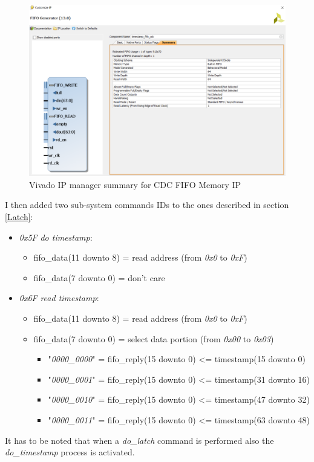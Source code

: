 \begin{figure}[H]
	\centering
	\includegraphics[width=0.6\linewidth]{IMG/ch4/FIFO_IP}
	\caption{Vivado IP manager summary for CDC FIFO Memory IP}
	\label{fig:fifo_ip}
\end{figure}
\noindent I then added two sub-system commands IDs to the ones described in section \ref{Latch}:
\begin{itemize}
	\item \textit{0x5F} \textit{do timestamp}:
	\begin{itemize}
		\item fifo\_data(11 downto 8) = read address (from \textit{0x0} to \textit{0xF})
		\item fifo\_data(7 downto 0) = don't care
	\end{itemize}
	\item \textit{0x6F} \textit{read timestamp}:
	\begin{itemize}
		\item fifo\_data(11 downto 8) = read address (from \textit{0x0} to \textit{0xF})
		\item fifo\_data(7 downto 0) = select data portion (from \textit{0x00} to \textit{0x03})
		\begin{itemize}
			\item "\textit{0000\_0000}" = fifo\_reply(15 downto 0) <= timestamp(15 downto 0)
			\item "\textit{0000\_0001}" = fifo\_reply(15 downto 0) <= timestamp(31 downto 16)
			\item "\textit{0000\_0010}" = fifo\_reply(15 downto 0) <= timestamp(47 downto 32)
			\item "\textit{0000\_0011}" = fifo\_reply(15 downto 0) <= timestamp(63 downto 48)
		\end{itemize}
	\end{itemize}
\end{itemize}
\noindent It has to be noted that when a \textit{do\_latch} command is performed also the \textit{do\_timestamp} process is activated.
